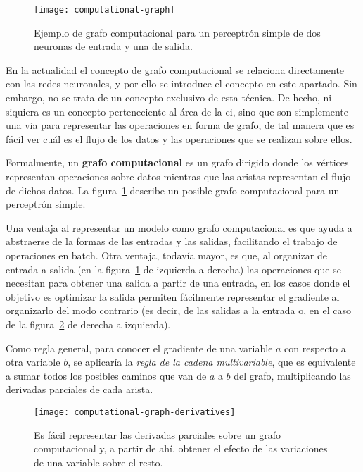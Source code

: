 \begin{figure}[!b]
	\centering
	\texttt{[image: computational-graph]}
	\caption[Ejemplo de grafo computacional.]{Ejemplo de grafo computacional para un perceptrón simple de dos neuronas de entrada y una de salida.}
	\label{fig:computational-graph}
\end{figure}

En la actualidad el concepto de grafo computacional se relaciona directamente con las redes neuronales, y por ello se introduce el concepto en este apartado. Sin embargo, no se trata de un concepto exclusivo de esta técnica. De hecho, ni siquiera es un concepto perteneciente al área de la \ac{ci}, sino que son simplemente una via para representar las operaciones en forma de grafo, de tal manera que es fácil ver cuál es el flujo de los datos y las operaciones que se realizan sobre ellos.

Formalmente, un \textbf{grafo computacional} es un grafo dirigido donde los vértices representan operaciones sobre datos mientras que las aristas representan el flujo de dichos datos. La figura~\ref{fig:computational-graph} describe un posible grafo computacional para un perceptrón simple.

Una ventaja al representar un modelo como grafo computacional es que ayuda a abstraerse de la formas de las entradas y las salidas, facilitando el trabajo de operaciones en batch. Otra ventaja, todavía mayor, es que, al organizar de entrada a salida (en la figura~\ref{fig:computational-graph} de izquierda a derecha) las operaciones que se necesitan para obtener una salida a partir de una entrada, en los casos donde el objetivo es optimizar la salida permiten fácilmente representar el gradiente al organizarlo del modo contrario (es decir, de las salidas a la entrada o, en el caso de la figura~\ref{fig:computational-graph-derivatives} de derecha a izquierda).

Como regla general, para conocer el gradiente de una variable $a$ con respecto a otra variable $b$, se aplicaría la \textit{regla de la cadena multivariable}, que es equivalente a sumar todos los posibles caminos que van de $a$ a $b$ del grafo, multiplicando las derivadas parciales de cada arista.

\begin{figure}[t]
	\centering
	\texttt{[image: computational-graph-derivatives]}
	\caption[Derivadas parciales sobre un grafo computacional.]{Es fácil representar las derivadas parciales sobre un grafo computacional y, a partir de ahí, obtener el efecto de las variaciones de una variable sobre el resto.}
	\label{fig:computational-graph-derivatives}
\end{figure}

